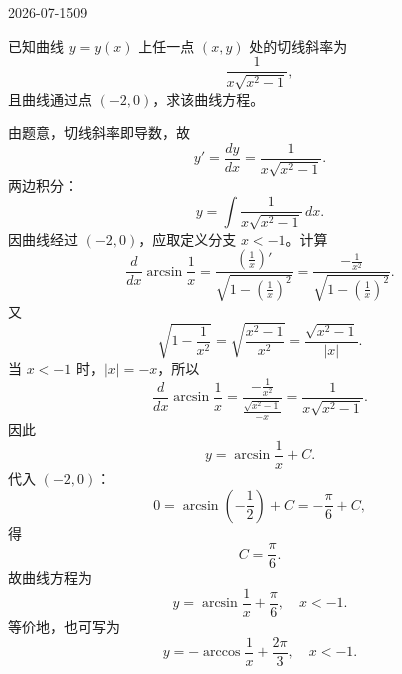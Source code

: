 \begin{mistake}{2026-07-15}{09}

\begin{problemcontent}
已知曲线 \(y=y(x)\) 上任一点 \((x,y)\) 处的切线斜率为
\[
\frac{1}{x\sqrt{x^2-1}},
\]
且曲线通过点 \((-2,0)\)，求该曲线方程。
\end{problemcontent}

\begin{solutioncontent}
由题意，切线斜率即导数，故
\[
y'=\frac{dy}{dx}=\frac{1}{x\sqrt{x^2-1}}.
\]
两边积分：
\[
y=\int \frac{1}{x\sqrt{x^2-1}}\,dx.
\]
因曲线经过 \((-2,0)\)，应取定义分支 \(x<-1\)。计算
\[
\frac{d}{dx}\arcsin\frac1x
=\frac{\left(\frac1x\right)'}{\sqrt{1-\left(\frac1x\right)^2}}
=\frac{-\frac1{x^2}}{\sqrt{1-\left(\frac1x\right)^2}}.
\]
又
\[
\sqrt{1-\frac1{x^2}}
=\sqrt{\frac{x^2-1}{x^2}}
=\frac{\sqrt{x^2-1}}{|x|}.
\]
当 \(x<-1\) 时，\(|x|=-x\)，所以
\[
\frac{d}{dx}\arcsin\frac1x
=\frac{-\frac1{x^2}}{\frac{\sqrt{x^2-1}}{-x}}
=\frac{1}{x\sqrt{x^2-1}}.
\]
因此
\[
y=\arcsin\frac1x+C.
\]
代入 \((-2,0)\)：
\[
0=\arcsin\left(-\frac12\right)+C=-\frac{\pi}{6}+C,
\]
得
\[
C=\frac{\pi}{6}.
\]
故曲线方程为
\[
y=\arcsin\frac1x+\frac{\pi}{6},\quad x<-1.
\]
等价地，也可写为
\[
y=-\arccos\frac1x+\frac{2\pi}{3},\quad x<-1.
\]
\end{solutioncontent}


\end{mistake}

